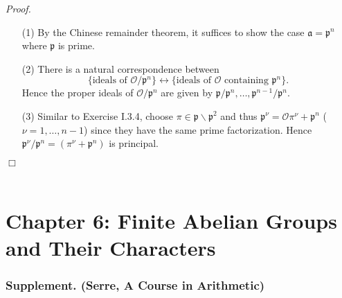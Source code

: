 \documentclass{article}
\begin{document}
\emph{Proof.}
\begin{enumerate}
\item[(1)]
  By the Chinese remainder theorem,
  it suffices to show the case $\mathfrak{a} = \mathfrak{p}^n$ where $\mathfrak{p}$ is prime.

\item[(2)]
  There is a natural correspondence between
  \[
    \{ \text{ideals of $\mathcal{O}/\mathfrak{p}^n$} \}
    \longleftrightarrow
    \{ \text{ideals of $\mathcal{O}$ containing $\mathfrak{p}^n$} \}.
  \]
  Hence the proper ideals of $\mathcal{O}/\mathfrak{p}^n$
  are given by $\mathfrak{p}/\mathfrak{p}^n, \ldots, \mathfrak{p}^{n-1}/\mathfrak{p}^n$.

\item[(3)]
  Similar to Exercise I.3.4,
  choose $\pi \in \mathfrak{p} \smallsetminus \mathfrak{p}^2$
  and thus $\mathfrak{p}^{\nu} = \mathcal{O}\pi^{\nu} + \mathfrak{p}^n$
  ($\nu = 1, \ldots, n-1$)
  since they have the same prime factorization.
  Hence
  $\mathfrak{p}^{\nu}/\mathfrak{p}^n = (\pi^{\nu} + \mathfrak{p}^n)$ is principal.
\end{enumerate}
$\Box$ \\\\









\newpage
\section*{Chapter 6: Finite Abelian Groups and Their Characters \\}






\subsubsection*{Supplement. (Serre, A Course in Arithmetic)}
\end{document}

